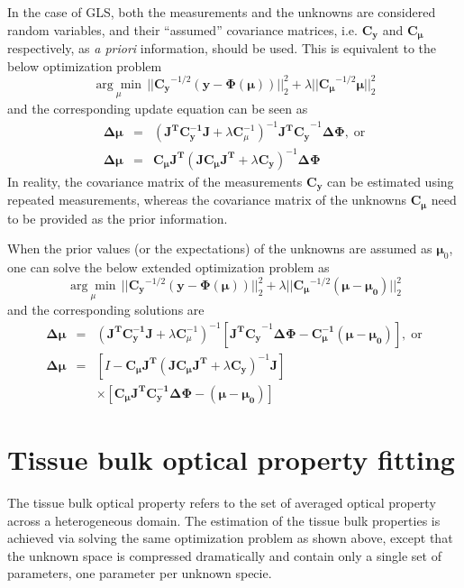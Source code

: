 \documentclass{article}
\begin{document}
In the case of GLS, both the measurements and the unknowns are considered random variables, and their ``assumed'' covariance matrices, i.e. $\mathbf{C_y}$ and $\mathbf{C_\mu}$ respectively, as \emph{a priori} information, should be used. This is equivalent to the below optimization problem
\begin{equation}
\underset{\mu}{\arg\min} \, || \mathbf{C_y}^{-1/2}\left(\boldsymbol{y-\Phi(\mu)}\right) ||^2_2 + \lambda|| \mathbf{C_\mu}^{-1/2}\boldsymbol{\mu} ||^2_2
\end{equation}
and the corresponding update equation can be seen as
\begin{eqnarray}
\mathbf{\Delta\mu}&=&(\mathbf{J^TC_y^{-1}J}+\lambda \mathbf{C}_\mu^{-1})^{-1}\mathbf{J^TC_y}^{-1}\mathbf{\Delta\Phi},\;\mathrm{or}\label{eq:overgls}\\
\mathbf{\Delta\mu}&=&\mathbf{C_\mu J^T}(\mathbf{JC_\mu J^T}+\lambda \mathbf{C_y})^{-1}\mathbf{\Delta\Phi}\label{eq:undergls}
\end{eqnarray}
In reality, the covariance matrix of the measurements $\mathbf{C_y}$ can be estimated using repeated measurements, whereas the covariance matrix of the unknowns $\mathbf{C_\mu}$ need to be provided as the prior information.

When the prior values (or the expectations) of the unknowns are assumed as $\boldsymbol\mu_0$, one can solve the below extended optimization problem as
\begin{equation}\label{eq:objfunglsprior}
\underset{\mu}{\arg\min} \, || \mathbf{C_y}^{-1/2}\left(\boldsymbol{y-\Phi(\mu)}\right) ||^2_2 + \lambda|| \mathbf{C_\mu}^{-1/2}(\boldsymbol{\mu-\mu_0}) ||^2_2
\end{equation}
and the corresponding solutions are
\begin{eqnarray}
\mathbf{\Delta\mu}&=&(\mathbf{J^TC_y^{-1}J}+\lambda \mathbf{C}_\mu^{-1})^{-1}\left[\mathbf{J^TC_y}^{-1}\mathbf{\Delta\Phi} - \boldsymbol{C_\mu^{-1}(\mu-\mu_0)}\right],\;\mathrm{or}\label{eq:overglsprior}\\\nonumber
\mathbf{\Delta\mu}&=&\left[ I - \mathbf{C_\mu J^T}(\mathbf{JC_\mu J^T}+\lambda \mathbf{C_y})^{-1}\mathbf{J}\right] \\
 && \times\left[\mathbf{C_\mu J^TC_y^{-1}\Delta\Phi} - \boldsymbol{(\mu - \mu_0)}\right]\label{eq:underglsprior}
\end{eqnarray}

\section{Tissue bulk optical property fitting}\label{sec:bulkfitting}
The tissue bulk optical property refers to the set of averaged optical property across a heterogeneous domain. The estimation of the tissue bulk properties is achieved via solving the same optimization problem as shown above, except that the unknown space is compressed dramatically and contain only a single set of parameters, one parameter per unknown specie. 
\end{document}
